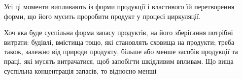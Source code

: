 Усі ці моменти випливають із форми продукції і властивого їй
перетворення форми, що його мусить проробити продукт у процесі
циркуляції.

Хоч яка буде суспільна форма запасу продуктів, на його зберігання потрібні
витрати: будівлі, вмістища тощо, які становлять сховища на продукти;
треба також, залежно від природи продукту, більше або менше засобів продукції
та праці, які мусять витрачатися, щоб запобігти шкідливим
впливам. Що вища суспільна концентрація запасів, то відносно менші
\parbreak{}  %
